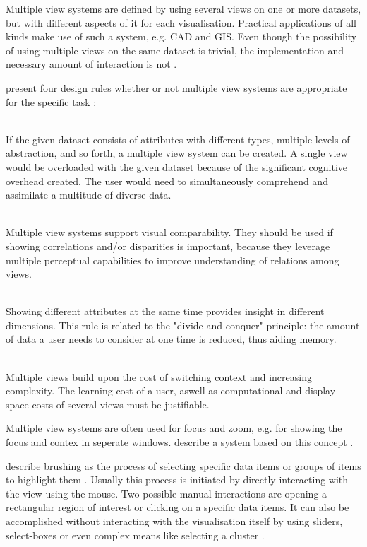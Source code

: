 Multiple view systems are defined by using several views on one or more datasets, but with different aspects of it for each visualisation. Practical applications of all kinds make use of such a system, e.g. \ac{CAD} and \ac{GIS}. Even though the possibility of using multiple views on the same dataset is trivial, the implementation and necessary amount of interaction is not .

\citeauthor{Baldonado2000} present four design rules whether or not multiple view systems are appropriate for the specific task :

\begin{enumerate}

 \hfill \\
If the given dataset consists of attributes with different types, multiple levels of abstraction, and so forth, a multiple view system can be created. A single view would be overloaded with the given dataset because of the significant cognitive overhead created. The user would need to simultaneously comprehend and assimilate a multitude of diverse data.

\newpage
{} \hfill \\
Multiple view systems support visual comparability. They should be used if showing correlations and/or disparities is important, because they leverage multiple perceptual capabilities to improve understanding of relations among views.

 \hfill \\
Showing different attributes at the same time provides insight in different dimensions. This rule is related to the "divide and conquer" principle: the amount of data a user needs to consider at one time is reduced, thus aiding memory.

 \hfill \\
Multiple views build upon the cost of switching context and increasing complexity. The learning cost of a user, aswell as computational and display space costs of several views must be justifiable.

\end{enumerate}

Multiple view systems are often used for focus and zoom, e.g. for showing the focus and contex in seperate windows. \citeauthor{Robert:1998} describe a system based on this concept .

\citeauthor{Martin:1995} describe brushing as the process of selecting specific data items or groups of items to highlight them . Usually this process is initiated by directly interacting with the view using the mouse. Two possible manual interactions are opening a rectangular region of interest or clicking on a specific data items. It can also be accomplished without interacting with the visualisation itself by using sliders, select-boxes or even complex means like selecting a cluster .


